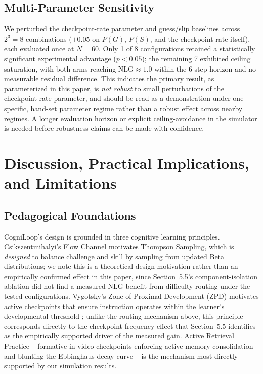 \documentclass[notitlepage,12pt]{jedm}
\begin{document}
\subsection{Multi-Parameter Sensitivity}
We perturbed the checkpoint-rate parameter and guess/slip baselines across $2^3=8$ combinations ($\pm0.05$ on $P(G)$, $P(S)$, and the checkpoint rate itself), each evaluated once at $N=60$. Only 1 of 8 configurations retained a statistically significant experimental advantage ($p<0.05$); the remaining 7 exhibited ceiling saturation, with both arms reaching $\text{NLG} \approx 1.0$ within the 6-step horizon and no measurable residual difference. This indicates the primary result, as parameterized in this paper, is \emph{not robust} to small perturbations of the checkpoint-rate parameter, and should be read as a demonstration under one specific, hand-set parameter regime rather than a robust effect across nearby regimes. A longer evaluation horizon or explicit ceiling-avoidance in the simulator is needed before robustness claims can be made with confidence.

\section{Discussion, Practical Implications, and Limitations}

\subsection{Pedagogical Foundations}
CogniLoop's design is grounded in three cognitive learning principles. Csikszentmihalyi's Flow Channel motivates Thompson Sampling, which is \emph{designed} to balance challenge and skill by sampling from updated Beta distributions; we note this is a theoretical design motivation rather than an empirically confirmed effect in this paper, since Section~5.5's component-isolation ablation did not find a measured NLG benefit from difficulty routing under the tested configurations. Vygotsky's Zone of Proximal Development (ZPD) motivates active checkpoints that ensure instruction operates within the learner's developmental threshold \cite{bloom19842}; unlike the routing mechanism above, this principle corresponds directly to the checkpoint-frequency effect that Section~5.5 identifies as the empirically supported driver of the measured gain. Active Retrieval Practice -- formative in-video checkpoints enforcing active memory consolidation and blunting the Ebbinghaus decay curve \cite{karpicke2008critical} -- is the mechanism most directly supported by our simulation results.
\end{document}
